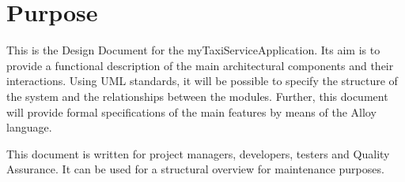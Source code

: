 \section{Purpose}
\label{sec:purpose}

This is the Design Document for the myTaxiServiceApplication. Its aim is to provide a functional description of the main architectural components and their interactions. 
Using UML standards, it will be possible to specify the structure of the system and the relationships between the modules.
Further, this document will provide formal specifications of the main features by means of the Alloy language.

This document is written for project managers, developers, testers and Quality Assurance. It can be used for a structural overview for maintenance purposes.   
